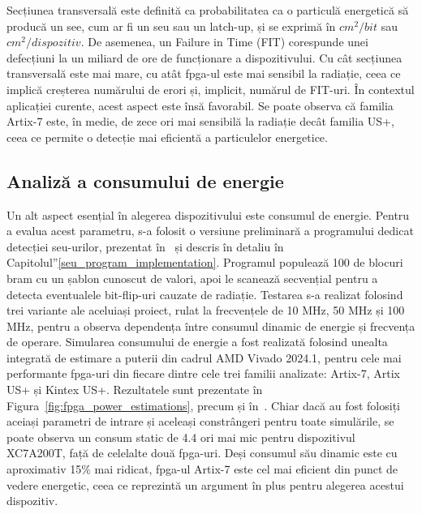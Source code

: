 \documentclass[12pt,a4paper]{report}
\begin{document}
Secțiunea transversală este definită ca probabilitatea ca o particulă energetică să producă un \gls{see}, cum ar fi un \gls{seu} sau un latch-up, și se exprimă în \(cm^2/bit\) sau \(cm^2/dispozitiv\). De asemenea, un Failure in Time (FIT) corespunde unei defecțiuni la un miliard de ore de funcționare a dispozitivului. Cu cât secțiunea transversală este mai mare, cu atât \gls{fpga}-ul este mai sensibil la radiație, ceea ce implică creșterea numărului de erori și, implicit, numărul de FIT-uri. În contextul aplicației curente, acest aspect este însă favorabil. Se poate observa că familia Artix-7 este, în medie, de zece ori mai sensibilă la radiație decât familia US+, ceea ce permite o detecție mai eficientă a particulelor energetice.

\subsection{Analiză a consumului de energie}
Un alt aspect esențial în alegerea dispozitivului este consumul de energie. Pentru a evalua acest parametru, s-a folosit o versiune preliminară a programului dedicat detecției \gls{seu}-urilor, prezentat în~\cite{isetc} și descris în detaliu în Capitolul”\ref{seu_program_implementation}. Programul populează 100 de blocuri \gls{bram} cu un șablon cunoscut de valori, apoi le scanează secvențial pentru a detecta eventualele bit-flip-uri cauzate de radiație. Testarea s-a realizat folosind trei variante ale aceluiași proiect, rulat la frecvențele de 10 MHz, 50 MHz și 100 MHz, pentru a observa dependența între consumul dinamic de energie și frecvența de operare. Simularea consumului de energie a fost realizată folosind unealta integrată de estimare a puterii din cadrul AMD Vivado 2024.1, pentru cele mai performante \gls{fpga}-uri din fiecare dintre cele trei familii analizate: Artix-7, Artix US+ și Kintex US+. Rezultatele sunt prezentate în Figura~\ref{fig:fpga_power_estimations}, precum și în~\cite{jes}. Chiar dacă au fost folosiți aceiași parametri de intrare și aceleași constrângeri pentru toate simulările, se poate observa un consum static de 4.4 ori mai mic pentru dispozitivul XC7A200T, față de celelalte două \gls{fpga}-uri. Deși consumul său dinamic este cu aproximativ 15\% mai ridicat, \gls{fpga}-ul Artix-7 este cel mai eficient din punct de vedere energetic, ceea ce reprezintă un argument în plus pentru alegerea acestui dispozitiv.
\end{document}
